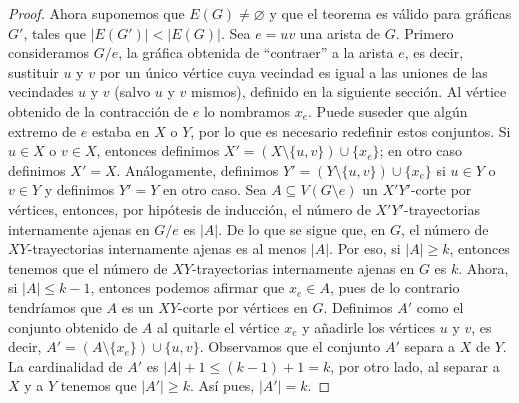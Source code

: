 \begin{proof}
    Ahora suponemos que $E(G) \neq \varnothing$ y que el teorema es v\'alido
    para gr\'aficas $G'$, tales que $|E(G')| < |E(G)|$. Sea $e = uv$ una arista
    de $G$. Primero consideramos $G/e$, la gr\'afica obtenida de ``contraer'' a
    la arista $e$, es decir, sustituir $u$ y $v$ por un \'unico v\'ertice cuya
    vecindad es igual a las uniones de las vecindades $u$ y $v$ (salvo $u$ y $v$
    mismos), definido en la siguiente secci\'on. Al v\'ertice obtenido de la
    contracci\'on de $e$ lo nombramos $x_e$. Puede suseder que alg\'un extremo
    de $e$ estaba en $X$ o $Y$, por lo que es necesario redefinir estos
    conjuntos. Si $u\in X$ o $v\in X$, entonces definimos $X'=(X \setminus
    \{u,v\}) \cup \{x_e\}$; en otro caso definimos $X'=X$. An\'alogamente,
    definimos $Y'= (Y \setminus \{u,v\}) \cup \{x_e\}$ si $u \in Y$ o $v \in Y$
    y definimos $Y'=Y$ en otro caso. Sea $A \subseteq V(G \setminus e)$ un
    $X'Y'$-corte por v\'ertices, entonces, por hip\'otesis de inducci\'on, el
    n\'umero de $X'Y'$-trayectorias internamente ajenas en $G/e$ es $|A|$. De lo
    que se sigue que, en $G$, el n\'umero de $XY$-trayectorias internamente
    ajenas es al menos $|A|$. Por eso, si $|A| \geq k$, entonces tenemos que el
    n\'umero de $XY$-trayectorias internamente ajenas en $G$ es $k$. Ahora, si
    $|A| \leq k-1$, entonces podemos afirmar que $x_e \in A$, pues de lo
    contrario tendr\'iamos que $A$ es un $XY$-corte por v\'ertices en $G$.
    Definimos $A'$ como el conjunto obtenido de $A$ al quitarle el v\'ertice
    $x_e$ y a\~{n}adirle los v\'ertices $u$ y $v$, es decir, $A'=(A \setminus
    \{x_e\})\cup \{u,v\}$. Observamos que el conjunto $A'$ separa  a $X$ de $Y$.
    La cardinalidad de $A'$ es $|A|+1 \leq (k-1)+1= k$, por otro lado, al
    separar a $X$ y a $Y$ tenemos que $|A'| \geq k$. As\'i pues, $|A'|=k$.


\end{proof}
